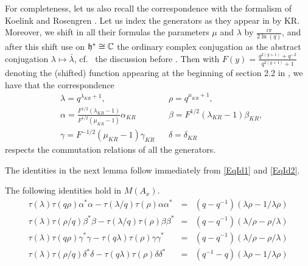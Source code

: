 




For completeness, let us also recall the correspondence with the formalism of Koelink and Rosengren \cite{KoR1}. Let us index the generators as they appear in \cite[Definition 2.6]{KoR1} by KR. Moreover, we shift in all their formulas the parameters $\mu$ and $\lambda$ by $\frac{i\pi}{2\ln(q)}$, and after this shift use on $\mathfrak{h}^* \cong \mathbb{C}$ the ordinary complex conjugation as the abstract conjugation $\lambda \mapsto \bar{\lambda}$, cf.~ the discussion before \cite[Definition 2.8]{KoR1}. Then with $F(y) = \frac{q^{2(y+1)}+q^{-2}}{q^{2(y+1)}+1}$ denoting the (shifted) function appearing at the beginning of section 2.2 in \cite{KoR1}, we have that the correspondence \begin{align} \nonumber &\lambda = q^{\lambda_{KR}+1},&& \rho = q^{\mu_{KR}+1},\\ \label{EqKR}&\alpha = \frac{F^{1/2}(\lambda_{KR}-1)}{F^{1/2}(\mu_{KR}-1)}\alpha_{KR}&& \beta = F^{1/2}(\lambda_{KR}-1)\beta_{KR},\\ \nonumber &\gamma = F^{-1/2}(\mu_{KR}-1)\gamma_{KR}&& \delta = \delta_{KR}\end{align} respects the commutation relations of all the generators. 

The identities in the next lemma follow immediately from \eqref{EqId1} and \eqref{EqId2}.

\begin{Lem} The following identities hold in $M(A_x)$. \begin{eqnarray}\label{EqId3} \tau(\lambda)\tau(q\rho)\alpha^*\alpha -\tau(\lambda/q)\tau(\rho)\alpha\alpha^* &=& (q-q^{-1})(\lambda\rho-1/\lambda\rho) \\
 \label{EqId4} \tau(\lambda)\tau(\rho/q) \beta^*\beta - \tau(\lambda/q)\tau(\rho) \beta\beta^* &=& (q-q^{-1})(\lambda/\rho-\rho/\lambda) \\  
  \tau(\lambda)\tau(q\rho)\gamma^*\gamma -\tau(q\lambda)\tau(\rho)  \gamma\gamma^* &=& (q-q^{-1})(\lambda/\rho-\rho/\lambda) \\
 \tau(\lambda)\tau(\rho/q)\delta^*\delta - \tau(q\lambda)\tau(\rho)\delta\delta^*   &=&  (q^{-1}-q)(\lambda\rho-1/\lambda\rho) 
 \end{eqnarray}


\end{Lem} 

